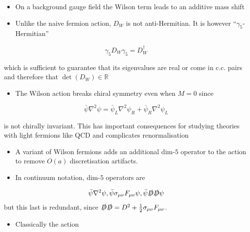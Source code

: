 \begin{itemize}
  \item On a background gauge field the Wilson term leads to an additive mass shift
  \item Unlike the naive fermion action, $D_W$ is not anti-Hermitian. It is however ``$\gamma_5$-Hermitian''
\end{itemize}

\begin{equation}
\gamma_{5} D_{W} \gamma_{5}=D_{W}^{\dagger}
\end{equation}

which is sufficient to guarantee that its eigenvalues are real or come in c.c. pairs and therefore that \(\operatorname{det}\left(D_{W}\right) \in \mathbb{R}\)

\begin{itemize}
  \item The Wilson action breaks chiral symmetry even when \(M=0\) since
\end{itemize}

\begin{equation}
\bar{\psi} \nabla^{2} \psi=\bar{\psi}_{L} \nabla^{2} \psi_{R}+\bar{\psi}_{R} \nabla^{2} \psi_{L}
\end{equation}

is not chirally invariant. This has important consequences for studying theories with light fermions like QCD and complicates renormalisation

\begin{itemize}
  \item A variant of Wilson fermions adds an additional dim-$5$ operator to the action to remove \(O(a)\) discretisation artifacts.
  \item In continuum notation, dim-$5$ operators are
\end{itemize}
\begin{equation}
    \bar{\psi} \nabla^2 \psi, \bar{\psi}\sigma_{\mu \nu} F_{\mu \nu}\psi, \bar{\psi}\slashed{D}\slashed{D} \psi 
\end{equation}
but this last is redundant, since $\slashed{D}\slashed{D} = D^2 + \frac{1}{2}\sigma_{\mu \nu}F_{\mu \nu}$. 
\begin{itemize}
  \item Classically the action
\end{itemize}

